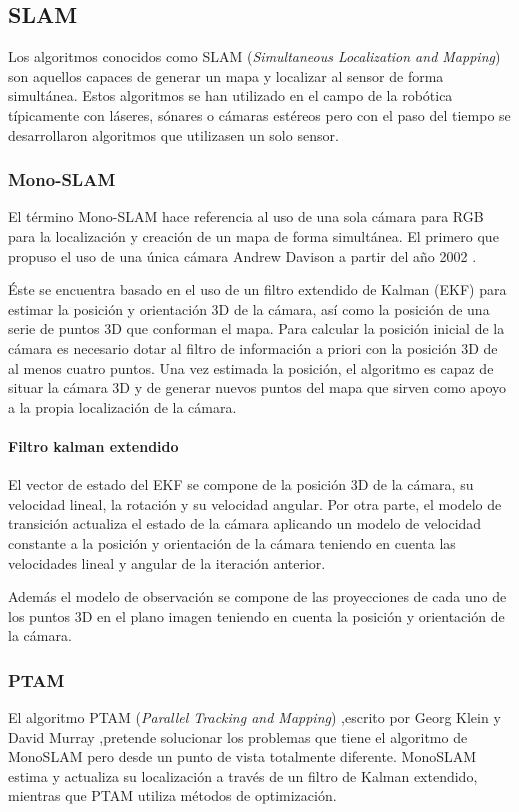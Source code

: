 \documentclass{bmvc2k}
\begin{document}
\subsection{SLAM}
Los algoritmos conocidos como SLAM (\textit{Simultaneous Localization and Mapping}) son aquellos capaces de generar un mapa y localizar al sensor de forma simultánea. Estos algoritmos se han utilizado en el campo de la robótica típicamente con láseres, sónares o cámaras estéreos pero con el paso del tiempo se desarrollaron algoritmos que utilizasen un solo sensor.

\subsubsection{Mono-SLAM}
El término Mono-SLAM hace referencia al uso de una sola cámara para RGB para la localización y creación de un mapa de forma simultánea. El primero que propuso el uso de una única cámara Andrew Davison a partir del año 2002 \cite{Davison07monoslam:real-time}.

Éste se encuentra basado en el uso de un filtro extendido de Kalman (EKF) para estimar la posición y orientación 3D de la cámara, así como la posición de una serie de puntos 3D que conforman el mapa. Para calcular la posición inicial de la cámara es necesario dotar al filtro de información a priori con la posición 3D de al menos cuatro puntos. Una vez estimada la posición, el algoritmo es capaz de situar la cámara 3D y de generar nuevos puntos del mapa que sirven como apoyo a la propia localización de la cámara.


\paragraph{Filtro kalman extendido}

El vector de estado del EKF se compone de la posición 3D de la cámara, su velocidad lineal, la rotación y su velocidad angular. Por otra parte, el modelo de transición actualiza el estado de la cámara aplicando un modelo de velocidad constante a la posición y orientación de la cámara teniendo en cuenta las velocidades lineal y angular de la iteración anterior.

Además el modelo de observación se compone de las proyecciones de cada uno de los puntos 3D en el plano imagen teniendo en cuenta la posición y orientación de la cámara.

\subsubsection{PTAM}
\label{sec:PTAM}
El algoritmo PTAM (\textit{Parallel Tracking and Mapping}) ,escrito por Georg Klein y David Murray \cite{klein07parallel},pretende solucionar los problemas que tiene el algoritmo de MonoSLAM pero desde un punto de vista totalmente diferente. MonoSLAM estima y actualiza su localización a través de un filtro de Kalman extendido, mientras que PTAM utiliza métodos de optimización.
\end{document}
